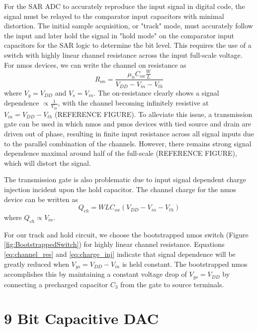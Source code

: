 \documentclass[10pt,journal]{IEEEtran}\usepackage{longtable}
\begin{document}
For the SAR ADC to accurately reproduce the input signal in digital code, the signal must be relayed to the comparator input capacitors with minimal distortion. The initial sample acquisition, or "track" mode, must accurately follow the input and later hold the signal in "hold mode" on the comparator input capacitors for the SAR logic to determine the bit level. This requires the use of a switch with highly linear channel resistance across the input full-scale voltage. For nmos devices, we can write the channel on resistance as
\begin{equation}
R_{on}=\frac{\mu_nC_{ox}\frac{W}{L}}{V_{DD}-V_{in}-V_{th}}
\label{eq:channel_res}
\end{equation}
where $V_g=V_{DD}$ and $V_{s}=V_{in}$. The on-resistance clearly shows a signal dependence $\propto\frac{1}{V_{in}}$, with the channel becoming infinitely resistive at $V_{in}=V_{DD}-V_{th}$ (REFERENCE FIGURE). To alleviate this issue, a transmission gate can be used in which nmos and pmos devices with tied source and drain are driven out of phase, resulting in finite input resistance across all signal inputs due to the parallel combination of the channels. However, there remains strong signal dependence maximal around half of the full-scale (REFERENCE FIGURE), which will distort the signal. 

The transmission gate is also problematic due to input signal dependent charge injection incident upon the hold capacitor. The channel charge for the nmos device can be written as
\begin{equation}
Q_{ch}=WLC_{ox}\left(V_{DD}-V_{in}-V_{th}\right)
\label{eq:charge_inj}
\end{equation}
where $Q_{ch}\propto V_{in}$. 

For our track and hold circuit, we choose the bootstrapped nmos switch (Figure \ref{fig:BootstrappedSwitch}) for highly linear channel resistance. Equations \ref{eq:channel_res} and \ref{eq:charge_inj} indicate that signal dependence will be greatly reduced when $V_{gs}=V_{DD}-V_{in}$ is held constant. The bootstrapped nmos accomplishes this by maintaining a constant voltage drop of $V_{gs}=V_{DD}$ by connecting a precharged capacitor $C_3$ from the gate to source terminals. 




\section{9 Bit Capacitive DAC}
\end{document}
